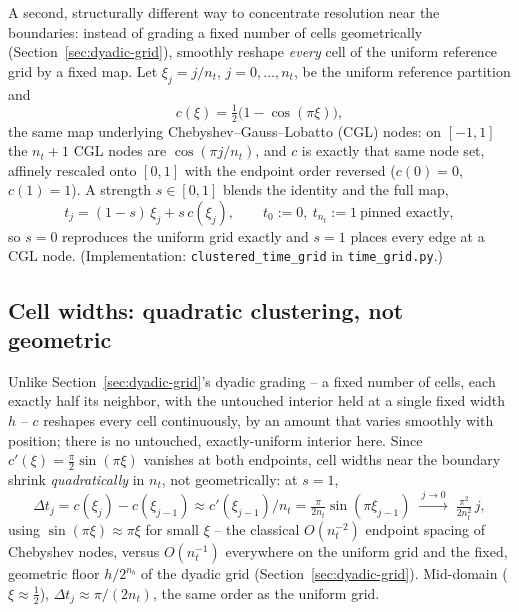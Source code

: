 \documentclass[11pt]{article}
\newcommand{\dt}{\Delta t}
\newcommand{\code}[1]{\texttt{#1}}
\begin{document}
A second, structurally different way to concentrate resolution near the boundaries: instead of
grading a fixed number of cells geometrically (Section~\ref{sec:dyadic-grid}), smoothly reshape
\emph{every} cell of the uniform reference grid by a fixed map. Let $\xi_j=j/n_t$, $j=0,\dots,n_t$,
be the uniform reference partition and
\begin{equation}
  \label{eq:cheb-map}
  c(\xi) = \tfrac12\bigl(1-\cos(\pi\xi)\bigr),
\end{equation}
the same map underlying Chebyshev--Gauss--Lobatto (CGL) nodes: on $[-1,1]$ the $n_t{+}1$ CGL
nodes are $\cos(\pi j/n_t)$, and $c$ is exactly that same node set, affinely rescaled onto
$[0,1]$ with the endpoint order reversed ($c(0)=0$, $c(1)=1$). A strength $s\in[0,1]$ blends the
identity and the full map,
\begin{equation}
  t_j = (1-s)\,\xi_j + s\,c(\xi_j), \qquad t_0:=0,\ t_{n_t}:=1\ \text{pinned exactly},
\end{equation}
so $s=0$ reproduces the uniform grid exactly and $s=1$ places every edge at a CGL node.
(Implementation: \code{clustered\_time\_grid} in \code{time\_grid.py}.)

\subsection*{Cell widths: quadratic clustering, not geometric}

Unlike Section~\ref{sec:dyadic-grid}'s dyadic grading -- a fixed number of cells, each exactly
half its neighbor, with the untouched interior held at a single fixed width $h$ -- $c$ reshapes
every cell continuously, by an amount that varies smoothly with position; there is no untouched,
exactly-uniform interior here. Since $c'(\xi)=\tfrac{\pi}{2}\sin(\pi\xi)$ vanishes at both
endpoints, cell widths near the boundary shrink \emph{quadratically} in $n_t$, not geometrically:
at $s=1$,
\begin{equation}
  \dt_j = c(\xi_j)-c(\xi_{j-1}) \approx c'(\xi_{j-1})/n_t = \tfrac{\pi}{2n_t}\sin(\pi\xi_{j-1})
  \;\xrightarrow{\ j\to0\ }\; \tfrac{\pi^2}{2n_t^2}\,j,
\end{equation}
using $\sin(\pi\xi)\approx\pi\xi$ for small $\xi$ -- the classical $O(n_t^{-2})$ endpoint spacing
of Chebyshev nodes, versus $O(n_t^{-1})$ everywhere on the uniform grid and the fixed, geometric
floor $h/2^{n_b}$ of the dyadic grid (Section~\ref{sec:dyadic-grid}). Mid-domain
($\xi\approx\tfrac12$), $\dt_j\approx\pi/(2n_t)$, the same order as the uniform grid.
\end{document}
